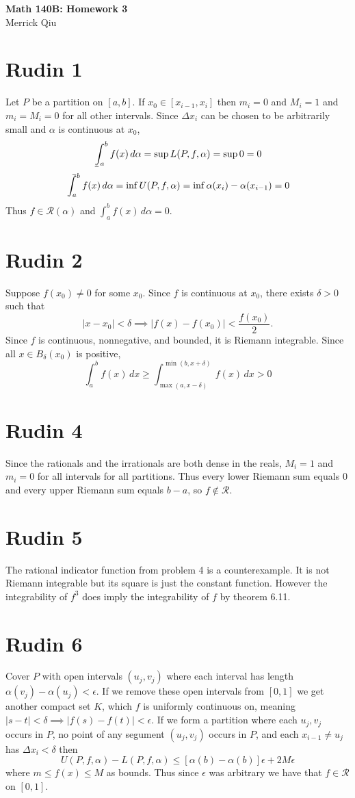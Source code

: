 \documentclass{article}
\def\upint{\mathchoice%
    {\mkern13mu\overline{\vphantom{\intop}\mkern7mu}\mkern-20mu}%
    {\mkern7mu\overline{\vphantom{\intop}\mkern7mu}\mkern-14mu}%
    {\mkern7mu\overline{\vphantom{\intop}\mkern7mu}\mkern-14mu}%
    {\mkern7mu\overline{\vphantom{\intop}\mkern7mu}\mkern-14mu}%
  \int}
\def\lowint{\mkern3mu\underline{\vphantom{\intop}\mkern7mu}\mkern-10mu\int}
\begin{document}
\begin{center}
	\huge{\bf Math 140B: Homework 3} \\
	Merrick Qiu
\end{center}

\section*{Rudin 1}
Let $P$ be a partition on $[a,b]$.
If $x_0 \in [x_{i-1},x_i]$ then $m_i = 0$ and $M_i = 1$ and 
$m_i = M_i = 0$ for all other intervals.
Since $\Delta x_i$ can be chosen to be arbitrarily small
and $\alpha$ is continuous at $x_0$,
\[
	\lowint_a^b f(x) \,d\alpha = \sup L(P,f,\alpha) = \sup 0 = 0
\]
\[
	\upint_a^b f(x) \,d\alpha = \inf U(P,f,\alpha) = \inf \alpha(x_i) - \alpha(x_{i-1}) = 0
\]
Thus $f \in \mathscr{R}(\alpha)$ and $\int_a^b f(x) \,d\alpha = 0$.

\section*{Rudin 2}
Suppose $f(x_0) \neq 0$ for some $x_0$.
Since $f$ is continuous at $x_0$, there exists $\delta > 0$
such that 
\[
	|x-x_0| < \delta \implies|f(x) - f(x_0)| < \frac{f(x_0)}{2}.
\]
Since $f$ is continuous, nonnegative, and bounded, it is Riemann integrable.
Since all $x \in B_\delta(x_0)$ is positive,
\[
	\int_a^b f(x) \,dx \geq \int_{\max(a, x-\delta)}^{\min(b, x+\delta)} f(x) \,dx > 0
\]

\section*{Rudin 4}
Since the rationals and the irrationals are both dense in the reals,
$M_i = 1$ and $m_i = 0$ for all intervals for all partitions.
Thus every lower Riemann sum equals $0$ and every upper Riemann sum equals $b-a$,
so $f \notin \mathscr{R}$.
\newpage 

\section*{Rudin 5}
The rational indicator function from problem 4 is a counterexample. 
It is not Riemann integrable but its square is just the constant function.
However the integrability of $f^3$ does imply the integrability of $f$
by theorem 6.11.

\section*{Rudin 6}
Cover $P$ with open intervals $(u_j, v_j)$ where each interval has length 
$\alpha(v_j) - \alpha(u_j) <\epsilon$.
If we remove these open intervals from $[0,1]$ we get another compact set $K$,
which $f$ is uniformly continuous on, meaning
$|s-t| < \delta \implies |f(s) - f(t)| < \epsilon$.
If we form a partition where each $u_j,v_j$ occurs in $P$, no point of 
any segument $(u_j,v_j)$ occurs in $P$, and each $x_{i-1} \neq u_j$ has $\Delta x_i < \delta$
then 
\[
	U(P,f,\alpha) - L(P,f,\alpha) \leq [\alpha(b) - \alpha(b)]\epsilon + 2M\epsilon
\]
where $m \leq f(x) \leq M$ as bounds.
Thus since $\epsilon$ was arbitrary we have that $f \in \mathscr{R}$ on $[0,1]$.
\newpage
\end{document}
